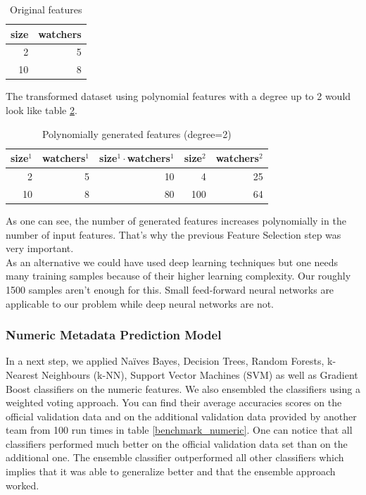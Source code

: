 \documentclass[%
a4paper,
DIV12,
2.5headlines,
bigheadings,
titlepage,
openbib,
]{scrartcl}
\begin{document}
\begin{table}[h]
\label{example-feature-engineering-basic}
\centering
\caption{Original features}
\begin{tabular}{|r|r|}
\hline
size & watchers \\ \hline
2    & 5        \\ \hline
10   & 8        \\ \hline
\end{tabular}
\end{table}

The transformed dataset using polynomial features with a degree up to 2 would look like table \ref{example-feature-engineering-transformed}.

\begin{table}[h]
\label{example-feature-engineering-transformed}
\centering
\caption{Polynomially generated features (degree=2)}
\begin{tabular}{|r|r|r|r|r|}
\hline
size$^1$ & watchers$^1$ & size$^1\cdot$watchers$^1$ & size$^2$ & watchers$^2$ \\ \hline
2 & 5 & 10 & 4 & 25 \\ \hline
10 & 8 & 80 & 100 & 64 \\ \hline
\end{tabular}
\end{table}
As one can see, the number of generated features increases polynomially in the number of input features.
That's why the previous Feature Selection step was very important.\\
As an alternative we could have used deep learning techniques but one needs many training samples because of their higher learning complexity.
Our roughly 1500 samples aren't enough for this.
Small feed-forward neural networks are applicable to our problem while deep neural networks are not.

\subsubsection{Numeric Metadata Prediction
Model}\label{numeric-metadata-prediction-model}
In a next step, we applied Naïves Bayes, Decision Trees, Random Forests, k-Nearest Neighbours (k-NN), Support Vector Machines (SVM) as well as Gradient Boost classifiers on the numeric features.
We also ensembled the classifiers using a weighted voting approach.
You can find their average accuracies scores on the official validation data and on the additional validation data provided by another team from 100 run times in table \ref{benchmark_numeric}.
One can notice that all classifiers performed much better on the official validation data set than on the additional one.
The ensemble classifier outperformed all other classifiers which implies that it was able to generalize better and that the ensemble approach worked.
\end{document}

